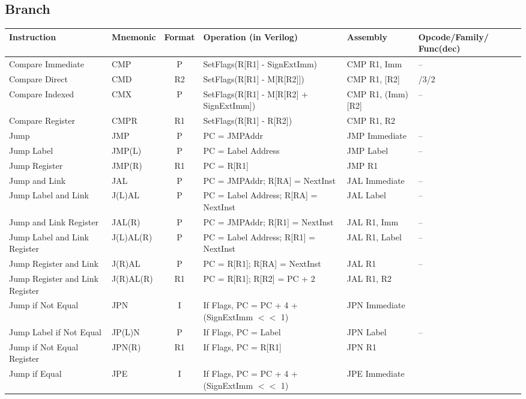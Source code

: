 \documentclass[a4paper,10pt]{article}
\begin{document}
\subsection*{Branch}
\begin{tabular}{>{\raggedright\arraybackslash\hangindent=0.2cm\hangafter=1}p{2.5cm}lc>{\raggedright\arraybackslash\hangindent=2.5cm\hangafter=1}p{5.7cm}l>{\centering\arraybackslash}p{2cm}}
\toprule
Instruction & Mnemonic & Format & Operation (in Verilog) & Assembly & Opcode/Family/ Func(dec) \\
\midrule
Compare Immediate & CMP & P & SetFlags(R[R1] - SignExtImm) & CMP R1, Imm & --\\
Compare Direct & CMD & R2 & SetFlags(R[R1] - M[R[R2]]) & CMP R1, [R2] & 13/3/2\\
Compare Indexed & CMX & P & SetFlags(R[R1] - M[R[R2] + SignExtImm]) & CMP R1, (Imm)[R2] & --\\
Compare Register & CMPR & R1 & SetFlags(R[R1] - R[R2]) & CMP R1, R2 & 6\\
Jump & JMP & P & PC = JMPAddr & JMP Immediate & --\\
Jump Label & JMP(L) & P & PC = Label Address & JMP Label & --\\
Jump Register & JMP(R) & R1 & PC = R[R1] & JMP R1 & 10\\
Jump and Link & JAL & P & PC = JMPAddr; R[RA] = NextInst & JAL Immediate & --\\
Jump Label and Link & J(L)AL & P & PC = Label Address; R[RA] = NextInst & JAL Label & --\\
Jump and Link Register & JAL(R) & P & PC = JMPAddr; R[R1] = NextInst & JAL R1, Imm & --\\
Jump Label and Link Register & J(L)AL(R) & P & PC = Label Address; R[R1] = NextInst & JAL R1, Label & --\\
Jump Register and Link & J(R)AL & P & PC = R[R1]; R[RA] = NextInst & JAL R1 & --\\
Jump Register and Link Register & J(R)AL(R) & R1 & PC = R[R1]; R[R2] = PC + 2 & JAL R1, R2 & 11\\
Jump if Not Equal & JPN & I & If Flags, PC = PC + 4 + (SignExtImm $<<$ 1) & JPN Immediate & 9\\
Jump Label if Not Equal & JP(L)N & P & If Flags, PC = Label & JPN Label & --\\
Jump if Not Equal Register & JPN(R) & R1 & If Flags, PC = R[R1] & JPN R1 & 12\\
Jump if Equal & JPE & I & If Flags, PC = PC + 4 + (SignExtImm $<<$ 1) & JPE Immediate & 10\\

\end{tabular}
\end{document}
